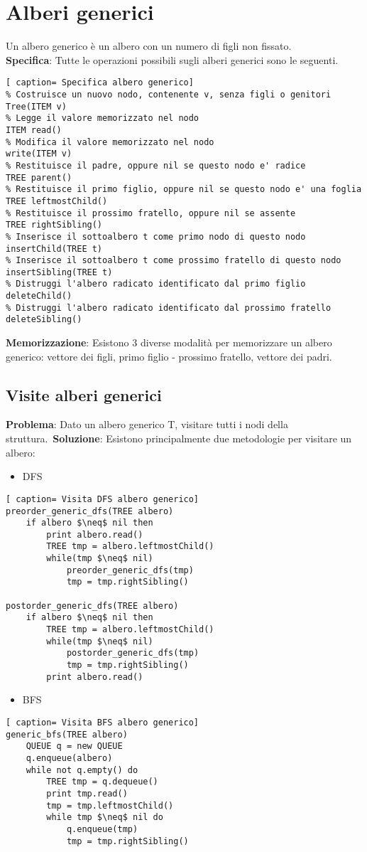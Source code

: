 \documentclass[../cheatSheetAlgoritmi.tex]{subfiles}
\begin{document}
\section{Alberi generici}
Un albero generico è un albero con un numero di figli non fissato.\\
\textbf{Specifica}: Tutte le operazioni possibili sugli alberi generici sono le seguenti. 
\begin{lstlisting}[ caption= Specifica albero generico]
% Costruisce un nuovo nodo, contenente v, senza figli o genitori
Tree(ITEM v)
% Legge il valore memorizzato nel nodo
ITEM read()
% Modifica il valore memorizzato nel nodo
write(ITEM v)
% Restituisce il padre, oppure nil se questo nodo e' radice
TREE parent()
% Restituisce il primo figlio, oppure nil se questo nodo e' una foglia
TREE leftmostChild()
% Restituisce il prossimo fratello, oppure nil se assente
TREE rightSibling()
% Inserisce il sottoalbero t come primo nodo di questo nodo
insertChild(TREE t)
% Inserisce il sottoalbero t come prossimo fratello di questo nodo
insertSibling(TREE t)
% Distruggi l'albero radicato identificato dal primo figlio
deleteChild()
% Distruggi l'albero radicato identificato dal prossimo fratello
deleteSibling()
\end{lstlisting}
\textbf{Memorizzazione}: Esistono 3 diverse modalità per memorizzare un albero generico: vettore dei figli, primo figlio - prossimo fratello, vettore dei padri.\

\subsection{Visite alberi generici}
\textbf{Problema}: Dato un albero generico T, visitare tutti i nodi della struttura.\
\textbf{Soluzione}: Esistono principalmente due metodologie per visitare un albero:
\begin{itemize}
	\item DFS
\end{itemize}
\begin{lstlisting}[ caption= Visita DFS albero generico]
preorder_generic_dfs(TREE albero)
	if albero $\neq$ nil then
		print albero.read()
		TREE tmp = albero.leftmostChild()
		while(tmp $\neq$ nil)
			preorder_generic_dfs(tmp)
			tmp = tmp.rightSibling()
    
postorder_generic_dfs(TREE albero)
	if albero $\neq$ nil then
		TREE tmp = albero.leftmostChild()
		while(tmp $\neq$ nil)
			postorder_generic_dfs(tmp)
			tmp = tmp.rightSibling()
		print albero.read()
\end{lstlisting}
\begin{itemize}
 	\item BFS
\end{itemize}
\begin{lstlisting}[ caption= Visita BFS albero generico]
generic_bfs(TREE albero)
	QUEUE q = new QUEUE
	q.enqueue(albero)
	while not q.empty() do
		TREE tmp = q.dequeue()
		print tmp.read()
		tmp = tmp.leftmostChild()
		while tmp $\neq$ nil do
			q.enqueue(tmp)
			tmp = tmp.rightSibling()
\end{lstlisting}
\end{document}
